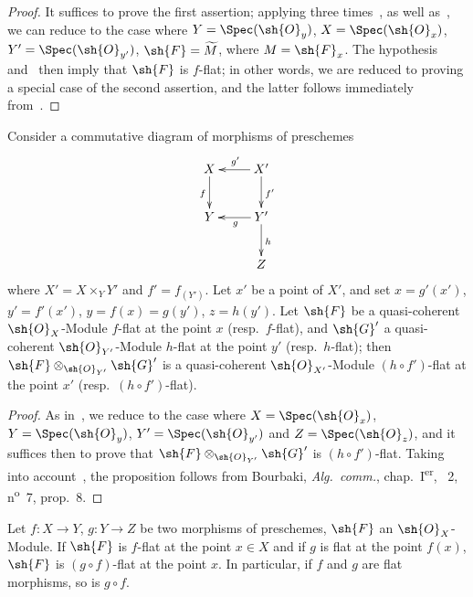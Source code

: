 \begin{proof}
It suffices to prove the first assertion; applying three times~, as well as~, we can reduce to the case where $Y=\Spec(\sh{O}_y)$, $X=\Spec(\sh{O}_x)$, $Y'=\Spec(\sh{O}_{y'})$, $\sh{F}=\widetilde{M}$, where $M=\sh{F}_x$.
The hypothesis and~ then imply that $\sh{F}$ is $f$-flat; in other words, we are reduced to proving a special case of the second assertion, and the latter follows immediately from~.
\end{proof}

\begin{proposition}[2.1.5]
\label{IV.2.1.5}
Consider a commutative diagram of morphisms of preschemes
\[
\xymatrix{
  X \ar[d]_f & X' \ar[l]_{g'} \ar[d]^{f'} \\
  Y & Y' \ar[l]^g \ar[d]^h \\
  & Z
}
\]
where $X'=X\times_Y Y'$ and $f'=f_{(Y')}$.
Let $x'$ be a point of $X'$, and set $x=g'(x')$, $y'=f'(x')$, $y=f(x)=g(y')$, $z=h(y')$.
Let $\sh{F}$ be a quasi-coherent $\sh{O}_X$-Module $f$-flat at the point $x$ \textnormal{(}resp.\ $f$-flat\textnormal{)}, and $\sh{G}'$ a quasi-coherent $\sh{O}_{Y'}$-Module $h$-flat at the point $y'$ \textnormal{(}resp.\ $h$-flat\textnormal{)}; then $\sh{F}\otimes_{\sh{O}_{Y'}}\sh{G}'$ is a quasi-coherent $\sh{O}_{X'}$-Module $(h\circ f')$-flat at the point $x'$ \textnormal{(}resp.\ $(h\circ f')$-flat\textnormal{)}.
\end{proposition}

\begin{proof}
As in~, we reduce to the case where $X=\Spec(\sh{O}_x)$, $Y=\Spec(\sh{O}_y)$,
$Y'=\Spec(\sh{O}_{y'})$ and $Z=\Spec(\sh{O}_z)$, and it suffices then to prove that $\sh{F}\otimes_{\sh{O}_{Y'}}\sh{G}'$ is $(h\circ f')$-flat.
Taking into account~, the proposition follows from Bourbaki, \emph{Alg.~comm.}, chap.~I\textsuperscript{er}, \textsection~2, n\textsuperscript{o}~7, prop.~8.
\end{proof}

\begin{corollary}[2.1.6]
\label{IV.2.1.6}
Let $f:X\to Y$, $g:Y\to Z$ be two morphisms of preschemes, $\sh{F}$ an $\sh{O}_X$-Module. If $\sh{F}$ is $f$-flat at the point $x\in X$ and if $g$ is flat at the point $f(x)$, $\sh{F}$ is $(g\circ f)$-flat at the point $x$.
In particular, if $f$ and $g$ are flat morphisms, so is $g\circ f$.
\end{corollary}

